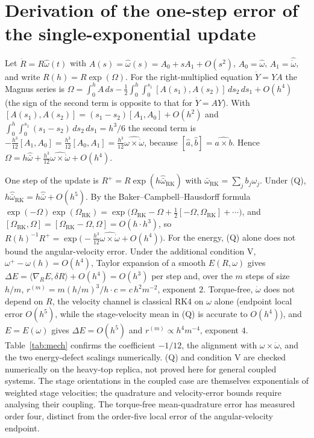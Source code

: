 \documentclass[10pt]{article}
\theoremstyle{definition}
\begin{document}
\section{Derivation of the one-step error of the single-exponential update}\label{app:magnus}

Let $\dot R=R\hat\omega(t)$ with $A(s)=\hat\omega(s)=A_0+sA_1+O(s^2)$, $A_0=\hat\omega$, $A_1=\widehat{\dot\omega}$, and
write $R(h)=R\exp(\Omega)$. For the right-multiplied equation $\dot Y=YA$ the Magnus series is
$\Omega=\int_0^hA\,ds-\tfrac12\int_0^h\!\int_0^{s_1}[A(s_1),A(s_2)]\,ds_2\,ds_1+O(h^4)$ (the sign of the second term is
opposite to that for $\dot Y=AY$). With $[A(s_1),A(s_2)]=(s_1-s_2)[A_1,A_0]+O(h^2)$ and
$\int_0^h\!\int_0^{s_1}(s_1-s_2)\,ds_2\,ds_1=h^3/6$ the second term is $-\tfrac{h^3}{12}[A_1,A_0]=\tfrac{h^3}{12}[A_0,A_1]
=\tfrac{h^3}{12}\widehat{\omega\times\dot\omega}$, because $[\hat a,\hat b]=\widehat{a\times b}$. Hence
$\Omega=h\hat{\bar\omega}+\tfrac{h^3}{12}\widehat{\omega\times\dot\omega}+O(h^4)$.

One step of the update is $R^+=R\exp(h\hat{\bar\omega}_{\mathrm{RK}})$ with $\bar\omega_{\mathrm{RK}}=\sum_jb_j\omega_j$.
Under (Q), $h\hat{\bar\omega}_{\mathrm{RK}}=h\hat{\bar\omega}+O(h^5)$. By the Baker--Campbell--Hausdorff formula
$\exp(-\Omega)\exp(\Omega_{\mathrm{RK}})=\exp\big(\Omega_{\mathrm{RK}}-\Omega+\tfrac12[-\Omega,\Omega_{\mathrm{RK}}]+\cdots\big)$,
and $[\Omega_{\mathrm{RK}},\Omega]=[\Omega_{\mathrm{RK}}-\Omega,\Omega]=O(h\cdot h^3)$, so
$R(h)^{-1}R^+=\exp\big(-\tfrac{h^3}{12}\widehat{\omega\times\dot\omega}+O(h^4)\big)$. For the energy, (Q) alone does not bound the angular-velocity error.
Under the additional condition V, $\omega^+-\omega(h)=O(h^4)$, Taylor
expansion of a smooth $E(R,\omega)$ gives
$\Delta E=\langle\nabla_RE,\delta R\rangle+O(h^4)=O(h^3)$ per step and, over the $m$ steps of size $h/m$, $r^{(m)}=m(h/m)^3/h\cdot c=c\,h^2m^{-2}$,
exponent $2$. Torque-free, $\dot\omega$ does not depend on $R$, the velocity channel is classical RK4 on $\omega$ alone
(endpoint local error $O(h^5)$, while the stage-velocity mean in (Q)
is accurate to $O(h^4)$), and $E=E(\omega)$ gives $\Delta E=O(h^5)$ and
$r^{(m)}\propto h^4m^{-4}$, exponent $4$. Table~\ref{tab:mech} confirms the coefficient $-1/12$, the alignment with
$\omega\times\dot\omega$, and the two energy-defect scalings numerically. (Q) and condition V are checked numerically on the heavy-top replica,
not proved here for general coupled systems. The stage orientations in the
coupled case are themselves exponentials of weighted stage velocities;
the quadrature and velocity-error bounds require analysing their coupling.
The torque-free mean-quadrature error has measured order four, distinct
from the order-five local error of the angular-velocity endpoint.
\end{document}

